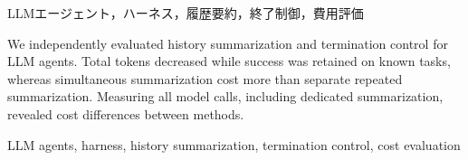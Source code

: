 \begin{abstract}
LLMエージェントの履歴要約と終了判断を独立に評価した．既知課題の成功を保つ総トークン数の削減を観測した一方，同時要約は別呼出し反復より高費用だった．専用要約を含む全モデル呼出しの計測により，方式間の費用差を示した．
\end{abstract}
\begin{keyword}
LLMエージェント，ハーネス，履歴要約，終了制御，費用評価
\end{keyword}
\begin{eabstract}
We independently evaluated history summarization and termination control for LLM agents. Total tokens decreased while success was retained on known tasks, whereas simultaneous summarization cost more than separate repeated summarization. Measuring all model calls, including dedicated summarization, revealed cost differences between methods.
\end{eabstract}
\begin{ekeyword}
LLM agents, harness, history summarization, termination control, cost evaluation
\end{ekeyword}
